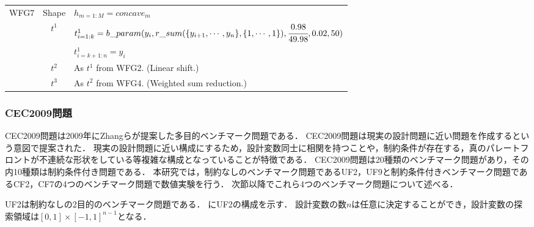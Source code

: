 \documentclass[../main/main]{subfiles}
\begin{document}
\begin{table}[htbp]
\begin{tabular}{|c||c|l|}
\hline
WFG7 & Shape & $h_{m = 1:M} = concave_m$\\
           &     $ t^1$  & $t^1_{i = 1:k} = b\_param(y_i , r\_sum(\{ y_{i+1}, \cdots, y_n \}, \{1, \cdots, 1\}), \cfrac{0.98}{49.98},0.02,50)$\\
           &                 & $ t^1_{i = k+1:n} = y_i$\\
           &     $t^2$   & As $t^1$ from WFG2. (Linear shift.)\\
           &     $t^3$   & As $t^2$ from WFG4. (Weighted sum reduction.)\\
\hline  
\end{tabular}
\end{table}

\clearpage

\subsubsection{CEC2009問題}
CEC2009問題\cite{Zhang2008Multiobjective}は2009年にZhangらが提案した多目的ベンチマーク問題である．
CEC2009問題は現実の設計問題に近い問題を作成するという意図で提案された．
現実の設計問題に近い構成にするため，設計変数同士に相関を持つことや，制約条件が存在する，真のパレートフロントが不連続な形状をしている等複雑な構成となっていることが特徴である．
CEC2009問題は20種類のベンチマーク問題があり，その内10種類は制約条件付き問題である．
本研究では，制約なしのベンチマーク問題であるUF2，UF9と制約条件付きベンチマーク問題であるCF2，CF7の4つのベンチマーク問題で数値実験を行う．
次節以降でこれら4つのベンチマーク問題について述べる．

UF2は制約なしの2目的のベンチマーク問題である．
にUF2の構成を示す．
設計変数の数$n$は任意に決定することができ，設計変数の探索領域は$[0,1] \times [-1,1]^{n-1}$となる．
\end{document}
